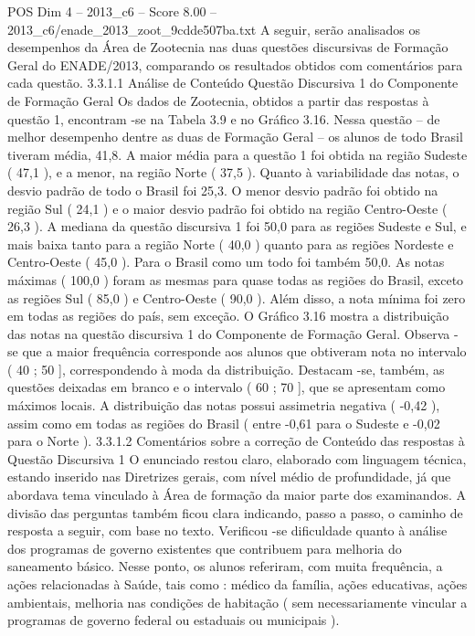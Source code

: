 \begin{textsample}{POS Dim 4 – 2013\_c6 – Score 8.00 – 2013\_c6/enade\_2013\_zoot\_9cdde507ba.txt}
A seguir, serão analisados os desempenhos da Área de Zootecnia nas duas questões discursivas de Formação Geral do ENADE/2013, comparando os resultados obtidos com comentários para cada questão. 3.3.1.1 Análise de Conteúdo Questão Discursiva 1 do Componente de Formação Geral Os dados de Zootecnia, obtidos a partir das respostas à questão 1, encontram -se na Tabela 3.9 e no Gráfico 3.16.
Nessa questão – de melhor desempenho dentre as duas de Formação Geral – os alunos de todo Brasil tiveram média, 41,8.
A maior média para a questão 1 foi obtida na região Sudeste ( 47,1 ), e a menor, na região Norte ( 37,5 ).
Quanto à variabilidade das notas, o desvio padrão de todo o Brasil foi 25,3.
O menor desvio padrão foi obtido na região Sul ( 24,1 ) e o maior desvio padrão foi obtido na região Centro-Oeste ( 26,3 ).
A mediana da questão discursiva 1 foi 50,0 para as regiões Sudeste e Sul, e mais baixa tanto para a região Norte ( 40,0 ) quanto para as regiões Nordeste e Centro-Oeste ( 45,0 ).
Para o Brasil como um todo foi também 50,0.
As notas máximas ( 100,0 ) foram as mesmas para quase todas as regiões do Brasil, exceto as regiões Sul ( 85,0 ) e Centro-Oeste ( 90,0 ).
Além disso, a nota mínima foi zero em todas as regiões do país, sem exceção.
O Gráfico 3.16 mostra a distribuição das notas na questão discursiva 1 do Componente de Formação Geral.
Observa -se que a maior frequência corresponde aos alunos que obtiveram nota no intervalo ( 40 ; 50 ], correspondendo à moda da distribuição.
Destacam -se, também, as questões deixadas em branco e o intervalo ( 60 ; 70 ], que se apresentam como máximos locais.
A distribuição das notas possui assimetria negativa ( -0,42 ), assim como em todas as regiões do Brasil ( entre -0,61 para o Sudeste e -0,02 para o Norte ). 3.3.1.2 Comentários sobre a correção de Conteúdo das respostas à Questão Discursiva 1 O enunciado restou claro, elaborado com linguagem técnica, estando inserido nas Diretrizes gerais, com nível médio de profundidade, já que abordava tema vinculado à Área de formação da maior parte dos examinandos.
A divisão das perguntas também ficou clara indicando, passo a passo, o caminho de resposta a seguir, com base no texto.
Verificou -se dificuldade quanto à análise dos programas de governo existentes que contribuem para melhoria do saneamento básico.
Nesse ponto, os alunos referiram, com muita frequência, a ações relacionadas à Saúde, tais como : médico da família, ações educativas, ações ambientais, melhoria nas condições de habitação ( sem necessariamente vincular a programas de governo federal ou estaduais ou municipais ).

\end{textsample}
